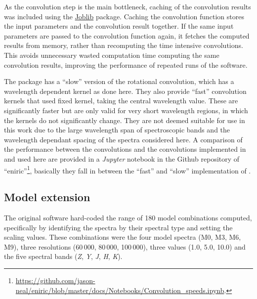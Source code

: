As the convolution step is the main bottleneck, caching of the convolution results was included using the \href{https://joblib.readthedocs.io}{Joblib} package.
Caching the convolution function stores the input parameters and the convolution result together.
If the same input parameters are passed to the convolution function again, it fetches the computed results from memory, rather than recomputing the time intensive convolutions.
This avoids unnecessary wasted computation time computing the same convolution results, improving the performance of repeated runs of the software.

The \pyastronomy{} package has a ``slow'' version of the rotational convolution, which has a wavelength dependent kernel as done here.
They also provide ``fast'' convolution kernels that used fixed kernel, taking the central wavelength value.
These are significantly faster but are only valid for very short wavelength regions, in which the kernels do not significantly change.
They are not deemed suitable for use in this work due to the large wavelength span of spectroscopic bands and the wavelength dependant spacing of the spectra considered here.
A comparison of the performance between the \pyastronomy{} convolutions and the convolutions implemented in \eniric{} and used here are provided in a \emph{Jupyter} notebook in the Github repository of ``eniric''\footnote{\href{https://github.com/jason-neal/eniric/blob/master/docs/Notebooks/Convolution_speeds.ipynb}{https://github.com/jason-neal/eniric/blob/master/docs/Notebooks/Convolution\_speeds.ipynb}.}, basically they fall in between the ``fast'' and ``slow'' implementation of \pyastronomy{}.


\subsection{Model extension}
\label{subsec:eniric_model_extesion}
The original software hard-coded the range of 180 model combinations computed, specifically by identifying the spectra by their spectral type and setting the \snr{} scaling values.
These combinations were the four model spectra (M0, {M3}, {M6}, {M9}), three resolutions (60\,000, 80\,000, 100\,000), three \Vsini{} values (1.0, 5.0, 10.0\kmps{}) and the five spectral bands (\emph{Z}, \emph{Y}, \emph{J}, \emph{H}, \emph{K}).


